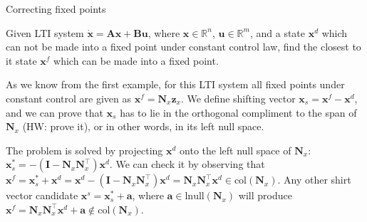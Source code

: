 \documentclass{beamer}
\begin{document}
\begin{frame}{Correcting fixed points}
\begin{flushleft}

Given LTI system $\dot{\mathbf{x}} = \mathbf{A} \mathbf{x} + \mathbf{B} \mathbf{u}$, where $\mathbf{x} \in \mathbb{R}^n$, $\mathbf{u} \in \mathbb{R}^m$, and a state $\mathbf{x}^d$ which can not be made into a fixed point under constant control law, find the closest to it state $\mathbf{x}^f$ which can be made into a fixed point.

\bigskip

As we know from the first example, for this LTI system all fixed points under constant control are given as $\mathbf{x}^f = \mathbf{N}_x \mathbf{z}_x$. We define shifting vector $\mathbf{x}_s = \mathbf{x}^f - \mathbf{x}^d$, and we can prove that $\mathbf{x}_s$ has to lie in the orthogonal compliment to the span of $\mathbf{N}_x$ (HW: prove it), or in other words, in its left null space.

\bigskip

The problem is solved by projecting $\mathbf{x}^d$ onto the left null space of $\mathbf{N}_x$: $\mathbf{x}^*_s = -(\mathbf{I} - \mathbf{N}_x\mathbf{N}^{\top}_x)\mathbf{x}^d$. We can check it by observing that $\mathbf{x}^f = \mathbf{x}^*_s + \mathbf{x}^d = \mathbf{x}^d - (\mathbf{I} - \mathbf{N}_x\mathbf{N}^{\top}_x)\mathbf{x}^d = \mathbf{N}_x\mathbf{N}^{\top}_x \mathbf{x}^d \in \text{col}(\mathbf{N}_x)$. Any other shirt vector candidate $\mathbf{x}^s = \mathbf{x}^*_s + \mathbf{a}$, where $\mathbf{a} \in \text{lnull}(\mathbf{N}_x)$ will produce $\mathbf{x}^f =  \mathbf{N}_x\mathbf{N}^{\top}_x \mathbf{x}^d + \mathbf{a} \notin \text{col}(\mathbf{N}_x)$.

\end{flushleft}
\end{frame}
\end{document}
